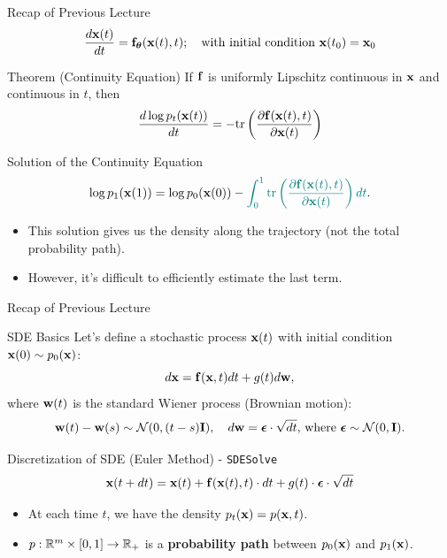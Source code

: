 \documentclass{beamer}
\begin{document}
\begin{frame}
\titlepage
\end{frame}
\begin{frame}{Recap of Previous Lecture}
	\[
 		\frac{d \mathbf{x}(t)}{dt} = \mathbf{f}_{\boldsymbol{\theta}}(\mathbf{x}(t), t); \quad \text{with initial condition }\mathbf{x}(t_0) = \mathbf{x}_0
	\]
	\vspace{-0.3cm}
	\begin{block}{Theorem (Continuity Equation)}
		If $\mathbf{f}$ is uniformly Lipschitz continuous in $\mathbf{x}$ and continuous in $t$, then
		\[
			\frac{d \log p_t(\mathbf{x}(t))}{d t} = - \text{tr} \left( \frac{\partial \mathbf{f}(\mathbf{x}(t), t)}{\partial \mathbf{x}(t)} \right)
		\]
		\vspace{-0.5cm}
	\end{block}
	\begin{block}{Solution of the Continuity Equation}
		\vspace{-0.3cm}
		\[
			\log p_1(\mathbf{x}(1)) = \log p_0(\mathbf{x}(0)) - {\color{teal}\int_{0}^{1} \text{tr}  \left( \frac{\partial \mathbf{f}(\mathbf{x}(t), t)}{\partial \mathbf{x}(t)} \right) dt}.
		\]
	\end{block}
	\begin{itemize}
		\item This solution gives us the density along the trajectory (not the total probability path).
		\item However, it's difficult to efficiently estimate {\color{teal}the last term}.
	 \end{itemize}
\end{frame}
\begin{frame}{Recap of Previous Lecture}
	\vspace{-0.2cm}
	\begin{block}{SDE Basics}
		Let's define a stochastic process $\mathbf{x}(t)$ with initial condition $\mathbf{x}(0) \sim p_0(\mathbf{x})$:
		\[
			d\mathbf{x} = \mathbf{f}(\mathbf{x}, t) dt + g(t) d \mathbf{w}, 
		\]
		where $\mathbf{w}(t)$ is the standard Wiener process (Brownian motion):
		\vspace{-0.2cm}
		\[		
			\mathbf{w}(t) - \mathbf{w}(s) \sim \mathcal{N}(0, (t - s) \mathbf{I}), \quad d \mathbf{w} = \boldsymbol{\epsilon} \cdot \sqrt{dt}, \, \text{where } \boldsymbol{\epsilon} \sim \mathcal{N}(0, \mathbf{I}).
		\]
	\end{block}
	\vspace{-0.3cm}
	\begin{block}{Discretization of SDE (Euler Method) - \texttt{SDESolve}}
		\vspace{-0.3cm}
		\[
			\mathbf{x}(t + dt) = \mathbf{x}(t) + \mathbf{f}(\mathbf{x}(t), t) \cdot dt + g(t) \cdot \boldsymbol{\epsilon} \cdot \sqrt{dt}
		\]
		\vspace{-0.3cm}
	\end{block}
	\begin{itemize}
		\item At each time $t$, we have the density $p_t(\mathbf{x}) = p(\mathbf{x}, t)$.
		\item $p: \mathbb{R}^m \times [0, 1] \rightarrow \mathbb{R}_+$ is a \textbf{probability path} between $p_0(\mathbf{x})$ and $p_1(\mathbf{x})$.
	\end{itemize}
\end{frame}
\end{document}

